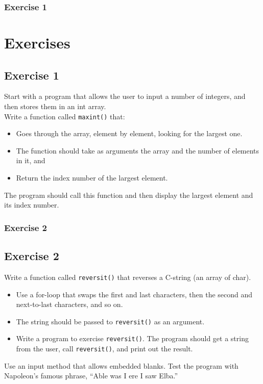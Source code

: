 \documentclass{beamer}
\begin{document}
\begin{frame}\frametitle{Exercise 1}
    \section{Exercises} %
    \label{sec:exercises}
    \subsection{Exercise 1} %
    \label{sub:exercise_1}
    Start with a program that allows the user to input a number of integers, and then stores them in an int array. \\
    Write a function called \texttt{maxint()} that:
    \begin{itemize}
        \item Goes through the array, element by element, looking for the largest one.
        \item The function should take as arguments the array and the number of elements in it, and
        \item Return the index number of the largest element.
    \end{itemize}
    The program should call this function and then display the largest element and its index number.
\end{frame}

\begin{frame}\frametitle{Exercise 2}
    \subsection{Exercise 2} %
    \label{sub:exercise_2}
    Write a function called \texttt{reversit()} that reverses a C-string (an array of char).
    \begin{itemize}
        \item Use a for-loop that swaps the first and last characters, then the second and next-to-last characters, and so on.
        \item The string should be passed to \texttt{reversit()} as an argument.
        \item Write a program to exercise \texttt{reversit()}. The program should get a string from the user, call \texttt{reversit()}, and print out the result.
    \end{itemize}
    Use an input method that allows embedded blanks. Test the program with Napoleon’s famous phrase,  ``Able was I ere I saw Elba.''
\end{frame}
\end{document}
